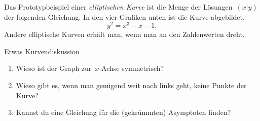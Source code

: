 \documentclass{zirkelblatt}
\begin{document}

Das Prototypbeispiel einer \emph{elliptischen Kurve} ist die Menge der
Lösungen~$(x|y)$ der folgenden Gleichung. In den vier Grafiken unten ist die
Kurve abgebildet.
\[ y^2 = x^3 - x - 1. \]
Andere elliptische Kurven erhält man, wenn man an den Zahlenwerten dreht.

\begin{aufgabeShaded}{Etwas Kurvendiskussion}
\begin{enumerate}
\item Wieso ist der Graph zur~$x$-Achse symmetrisch?
\item Wieso gibt es, wenn man genügend weit nach links geht, keine Punkte der
Kurve?
\item Kannst du eine Gleichung für die (gekrümmten) Asymptoten finden?
\end{enumerate}
\end{aufgabeShaded}
\end{document}
